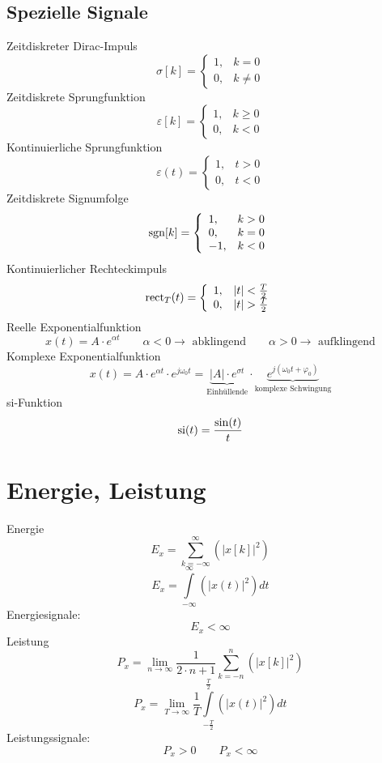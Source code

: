 \documentclass[a4paper, 10pt, fleqn]{article}
\begin{document}
\subsection{Spezielle Signale}
Zeitdiskreter Dirac-Impuls
\[
\sigma[k] = \left\{
    \begin{array}{ll}
        1, & k = 0 \\
        0, & k \neq 0
    \end{array}
\right.
\]
Zeitdiskrete Sprungfunktion
\[
\varepsilon[k] = \left\{
    \begin{array}{ll}
        1, & k \geq 0 \\
        0, & k < 0
    \end{array}
\right.
\]
Kontinuierliche Sprungfunktion
\[
\varepsilon(t) = \left\{
    \begin{array}{ll}
        1, & t > 0 \\
        0, & t < 0
    \end{array}
\right.
\]
Zeitdiskrete Signumfolge
\[
\operatorname{sgn}[k] = \left\{
    \begin{array}{ll}
        1,  & k > 0 \\
        0,  & k = 0 \\
        -1, & k < 0
    \end{array}
\right.
\]
Kontinuierlicher Rechteckimpuls
\[
\operatorname{rect}_T(t) = \left\{
    \begin{array}{ll}
        1, & |t| < \frac{T}{2} \\
        0, & |t| > \frac{T}{2}
    \end{array}
\right.
\]
Reelle Exponentialfunktion
\[ x(t) = A \cdot e^{\alpha t} \qquad \alpha < 0 \to \text{ abklingend} \qquad \alpha > 0 \to \text{ aufklingend} \]
Komplexe Exponentialfunktion
\[ x(t) = A \cdot e^{\alpha t} \cdot e^{j \omega_0 t} = \underbrace{|A| \cdot e^{\sigma t}}_{\text{Einhüllende}} \cdot \underbrace{e^{j(\omega_0 t + \varphi_0)}}_{\text{komplexe Schwingung}} \]
si-Funktion
\[ \operatorname{si}(t) = \frac{\sin(t)}{t} \]

\section{Energie, Leistung}
Energie
\[ E_x = \sum\limits_{k = -\infty}^{\infty} \left(\left|x[k]\right|^2\right) \]
\[ E_x = \int\limits_{-\infty}^{\infty} \left(\left|x(t)\right|^2\right) dt \]
Energiesignale: 
\[ E_x < \infty \]
Leistung
\[ P_x = \lim\limits_{n \to \infty} \frac{1}{2 \cdot n + 1} \sum\limits_{k = -n}^{n} \left(\left|x[k]\right|^2\right) \]
\[ P_x = \lim\limits_{T \to \infty} \frac{1}{T} \int\limits_{-\frac{T}{2}}^{\frac{T}{2}} \left(\left|x(t)\right|^2\right) dt \]
Leistungssignale:
\[ P_x > 0 \qquad P_x < \infty \]
\end{document}
